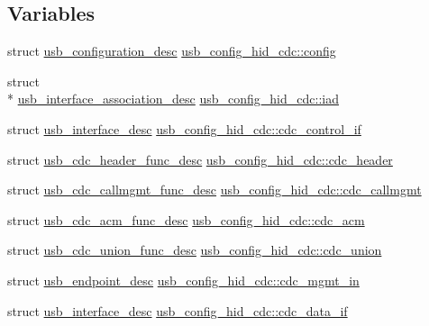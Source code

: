 \subsection*{Variables}
\begin{DoxyCompactItemize}
\item 
struct \hyperlink{structusb__configuration__desc}{usb\-\_\-configuration\-\_\-desc} \hyperlink{group___p_i_o_s___u_s_b___d_e_s_c_ga41025645591a4ff38c6bfb3bf799cdf1}{usb\-\_\-config\-\_\-hid\-\_\-cdc\-::config}
\item 
struct \\*
\hyperlink{structusb__interface__association__desc}{usb\-\_\-interface\-\_\-association\-\_\-desc} \hyperlink{group___p_i_o_s___u_s_b___d_e_s_c_ga0dc1bab4cabd04ace89b858ba3f7b259}{usb\-\_\-config\-\_\-hid\-\_\-cdc\-::iad}
\item 
struct \hyperlink{structusb__interface__desc}{usb\-\_\-interface\-\_\-desc} \hyperlink{group___p_i_o_s___u_s_b___d_e_s_c_ga9cc4f55f507f420505ac9114cf7b9df3}{usb\-\_\-config\-\_\-hid\-\_\-cdc\-::cdc\-\_\-control\-\_\-if}
\item 
struct \hyperlink{structusb__cdc__header__func__desc}{usb\-\_\-cdc\-\_\-header\-\_\-func\-\_\-desc} \hyperlink{group___p_i_o_s___u_s_b___d_e_s_c_gaedeb1a14bf5f0cfea7d70e97389205c8}{usb\-\_\-config\-\_\-hid\-\_\-cdc\-::cdc\-\_\-header}
\item 
struct \hyperlink{structusb__cdc__callmgmt__func__desc}{usb\-\_\-cdc\-\_\-callmgmt\-\_\-func\-\_\-desc} \hyperlink{group___p_i_o_s___u_s_b___d_e_s_c_ga1463830a390b3358935b4b39260c5762}{usb\-\_\-config\-\_\-hid\-\_\-cdc\-::cdc\-\_\-callmgmt}
\item 
struct \hyperlink{structusb__cdc__acm__func__desc}{usb\-\_\-cdc\-\_\-acm\-\_\-func\-\_\-desc} \hyperlink{group___p_i_o_s___u_s_b___d_e_s_c_gafafcc283fdd68e1f1f71b102c226fc23}{usb\-\_\-config\-\_\-hid\-\_\-cdc\-::cdc\-\_\-acm}
\item 
struct \hyperlink{structusb__cdc__union__func__desc}{usb\-\_\-cdc\-\_\-union\-\_\-func\-\_\-desc} \hyperlink{group___p_i_o_s___u_s_b___d_e_s_c_gafdccd743e5f58edeace549e15f512d44}{usb\-\_\-config\-\_\-hid\-\_\-cdc\-::cdc\-\_\-union}
\item 
struct \hyperlink{structusb__endpoint__desc}{usb\-\_\-endpoint\-\_\-desc} \hyperlink{group___p_i_o_s___u_s_b___d_e_s_c_gae83909d6ab80cf2e1ce3ecd22d1dc9ec}{usb\-\_\-config\-\_\-hid\-\_\-cdc\-::cdc\-\_\-mgmt\-\_\-in}
\item 
struct \hyperlink{structusb__interface__desc}{usb\-\_\-interface\-\_\-desc} \hyperlink{group___p_i_o_s___u_s_b___d_e_s_c_ga80b1d19d38b5379618c5e66f0da9dcb2}{usb\-\_\-config\-\_\-hid\-\_\-cdc\-::cdc\-\_\-data\-\_\-if}

\end{DoxyCompactItemize}
